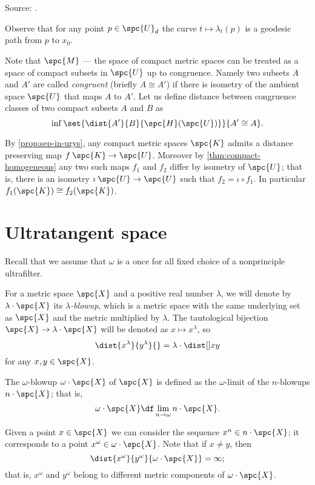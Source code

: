 Source: \cite[(d) on page 82]{gromov-2007}.

Observe that for any point $p\in \spc{U}_d$ the curve $t\mapsto \lambda_t(p)$ is a geodesic path from $p$ to $x_0$.








Note that $\spc{M}$ --- the space of compact metric spaces can be treated as a space of compact subsets in $\spc{U}$ up to congruence.
Namely two subsets $A$ and $A'$ are called \emph{congruent} (briefly $A\cong A'$) if there is isometry of the ambient space $\spc{U}$ that maps $A$ to $A'$.
Let us define distance between congruence classes of two compact subsets $A$ and $B$ as 
\[\inf\set{\dist{A'}{B}{\spc{H}(\spc{U})}}{A'\cong A}.\]


By \ref{prop:sep-in-urys}, any compact metric spaces $\spc{K}$ admits a distance preserving map $f\:\spc{K}\to\spc{U}$.
Moreover by \ref{thm:compact-homogeneous} any two such maps $f_1$ and $f_2$ differ by isometry of $\spc{U}$;
that is, there is an isometry $\iota\:\spc{U}\to\spc{U}$ such that $f_2=\iota\circ f_1$.
In particular $f_1(\spc{K})\cong f_2(\spc{K})$.










\section{Ultratangent space} 

Recall that we assume that $\omega$ is a once for all fixed choice of a nonprinciple ultrafilter.

For a metric space $\spc{X}$ and a positive real number $\lambda$,
we will denote by $\lambda\cdot\spc{X}$ its \emph{$\lambda$-blowup},
which is a metric space with the same underlying set as $\spc{X}$ and the metric multiplied by $\lambda$.
The tautological bijection $\spc{X}\to \lambda\cdot\spc{X}$ will be denoted as $x\mapsto x^\lambda$, 
so 
\[\dist{x^\lambda}{y^\lambda}{}
=
\lambda\cdot\dist[{{}}]{x}{y}{}\] 
for any $x,y\in \spc{X}$.

The $\omega$-blowup $\omega\cdot\spc{X}$ of $\spc{X}$ is defined as the $\omega$-limit
of the $n$-blowups $n\cdot\spc{X}$; that is,
\[\omega\cdot\spc{X}
\df
\lim_{n\to\omega} n\cdot\spc{X}.\]

Given a point $x\in \spc{X}$ we can consider the sequence $x^n\in n\cdot\spc{X}$;
it corresponds to a point $x^\omega\in \omega\cdot\spc{X}$.
Note that if $x\ne y$, then 
\[\dist{x^\omega}{y^\omega}{\omega\cdot\spc{X}}=\infty;\]
that is, 
$x^\omega$ and $y^\omega$ 
belong to different metric components of $\omega\cdot\spc{X}$.


